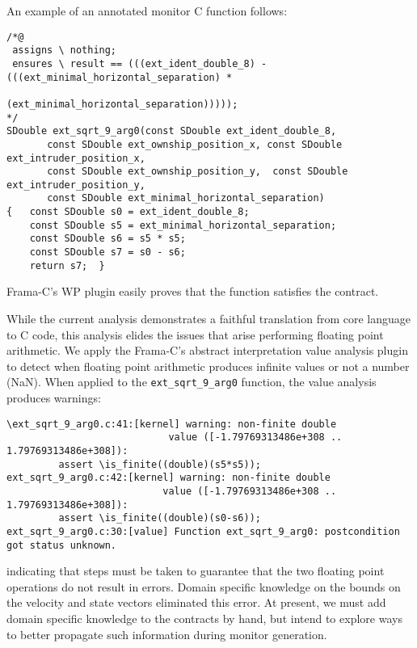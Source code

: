 An example of an annotated monitor C function follows: 

\begin{Verbatim}[fontsize=\scriptsize]
/*@
 assigns \ nothing;
 ensures \ result == (((ext_ident_double_8) - (((ext_minimal_horizontal_separation) *
                                 (ext_minimal_horizontal_separation)))));
*/
SDouble ext_sqrt_9_arg0(const SDouble ext_ident_double_8,
       const SDouble ext_ownship_position_x, const SDouble ext_intruder_position_x,
       const SDouble ext_ownship_position_y,  const SDouble ext_intruder_position_y,
       const SDouble ext_minimal_horizontal_separation)
{   const SDouble s0 = ext_ident_double_8;
    const SDouble s5 = ext_minimal_horizontal_separation;
    const SDouble s6 = s5 * s5;
    const SDouble s7 = s0 - s6;
    return s7;  }
\end{Verbatim}

\noindent
Frama-C's WP plugin easily proves that the function satisfies the
contract. 

While the current analysis demonstrates a faithful translation from
core language to C code, this analysis  elides the issues that
arise performing floating point arithmetic. We apply the  Frama-C's abstract
interpretation value analysis plugin  to detect when floating point
arithmetic produces infinite values  or not a number (NaN).
When applied to the  \texttt{ext\_sqrt\_9\_arg0} function, the value
analysis produces warnings:
\begin{Verbatim}[fontsize=\scriptsize]
\ext_sqrt_9_arg0.c:41:[kernel] warning: non-finite double 
                            value ([-1.79769313486e+308 .. 1.79769313486e+308]):
         assert \is_finite((double)(s5*s5));
ext_sqrt_9_arg0.c:42:[kernel] warning: non-finite double
                           value ([-1.79769313486e+308 .. 1.79769313486e+308]):
         assert \is_finite((double)(s0-s6));
ext_sqrt_9_arg0.c:30:[value] Function ext_sqrt_9_arg0: postcondition got status unknown.
\end{Verbatim}
indicating that steps must be taken to guarantee  that the two floating
point operations do not result in errors.  Domain specific knowledge
on the  bounds on the velocity and state vectors  eliminated this
error.  At present, we must add domain specific knowledge to the
contracts by hand, but intend to explore ways to better propagate such
information during monitor generation.  

